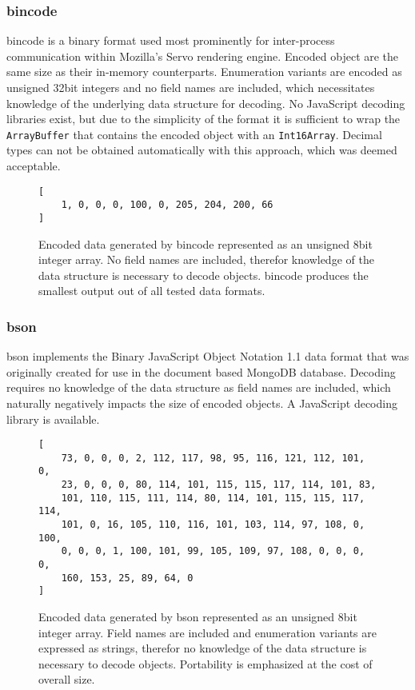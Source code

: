\subsubsection{bincode}
bincode is a binary format used most prominently for inter-process communication within Mozilla's Servo rendering engine. Encoded object are the same size as their in-memory counterparts. Enumeration variants are encoded as unsigned 32bit integers and no field names are included, which necessitates knowledge of the underlying data structure for decoding. No JavaScript decoding libraries exist, but due to the simplicity of the format it is sufficient to wrap the \texttt{ArrayBuffer} that contains the encoded object with an \texttt{Int16Array}. Decimal types can not be obtained automatically with this approach, which was deemed acceptable. 

\begin{figure}[H]
\begin{verbatim}
[
	1, 0, 0, 0, 100, 0, 205, 204, 200, 66
]
\end{verbatim}
\caption{Encoded data generated by bincode represented as an unsigned 8bit integer array. No field names are included, therefor knowledge of the data structure is necessary to decode objects. bincode produces the smallest output out of all tested data formats.} 
\end{figure}

\subsubsection{bson}
bson implements the Binary JavaScript Object Notation 1.1 \cite{bson-spec} data format that was originally created for use in the document based MongoDB database. Decoding requires no knowledge of the data structure as field names are included, which naturally negatively impacts the size of encoded objects. A JavaScript decoding library is available.
\begin{figure}[H]
\begin{verbatim}
[
	73, 0, 0, 0, 2, 112, 117, 98, 95, 116, 121, 112, 101, 0,
	23, 0, 0, 0, 80, 114, 101, 115, 115, 117, 114, 101, 83, 
	101, 110, 115, 111, 114, 80, 114, 101, 115, 115, 117, 114, 
	101, 0, 16, 105, 110, 116, 101, 103, 114, 97, 108, 0, 100, 
	0, 0, 0, 1, 100, 101, 99, 105, 109, 97, 108, 0, 0, 0, 0, 
	160, 153, 25, 89, 64, 0
]
\end{verbatim}
\caption{Encoded data generated by bson represented as an unsigned 8bit integer array. Field names are included and enumeration variants are expressed as strings, therefor no knowledge of the data structure is necessary to decode objects. Portability is emphasized at the cost of overall size.} 
\end{figure}

